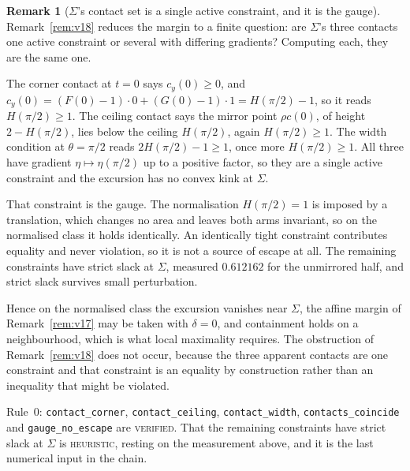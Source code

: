 \documentclass[11pt]{article}
\theoremstyle{definition}
\newtheorem{remark}[theorem]{Remark}
\newcommand{\Sig}{\Sigma}
\begin{document}
\begin{remark}[$\Sig$'s contact set is a single active constraint, and it is the gauge]\label{rem:v19}
Remark~\ref{rem:v18} reduces the margin to a finite question: are $\Sig$'s three contacts one
active constraint or several with differing gradients? Computing each, they are the same one.

The corner contact at $t=0$ says $c_y(0)\ge0$, and
$c_y(0)=(F(0)-1)\cdot0+(G(0)-1)\cdot1=H(\pi/2)-1$, so it reads $H(\pi/2)\ge1$. The ceiling
contact says the mirror point $\rho c(0)$, of height $2-H(\pi/2)$, lies below the ceiling
$H(\pi/2)$, again $H(\pi/2)\ge1$. The width condition at $\theta=\pi/2$ reads
$2H(\pi/2)-1\ge1$, once more $H(\pi/2)\ge1$. All three have gradient $\eta\mapsto\eta(\pi/2)$
up to a positive factor, so they are a single active constraint and the excursion has no
convex kink at $\Sig$.

That constraint is the gauge. The normalisation $H(\pi/2)=1$ is imposed by a translation,
which changes no area and leaves both arms invariant, so on the normalised class it holds
identically. An identically tight constraint contributes equality and never violation, so it
is not a source of escape at all. The remaining constraints have strict slack at $\Sig$,
measured $0.612162$ for the unmirrored half, and strict slack survives small perturbation.

Hence on the normalised class the excursion vanishes near $\Sig$, the affine margin of
Remark~\ref{rem:v17} may be taken with $\delta=0$, and containment holds on a neighbourhood,
which is what local maximality requires. The obstruction of Remark~\ref{rem:v18} does not
occur, because the three apparent contacts are one constraint and that constraint is an
equality by construction rather than an inequality that might be violated.

Rule~0: \verb|contact_corner|, \verb|contact_ceiling|, \verb|contact_width|,
\verb|contacts_coincide| and \verb|gauge_no_escape| are \textsc{verified}. That the remaining
constraints have strict slack at $\Sig$ is \textsc{heuristic}, resting on the measurement
above, and it is the last numerical input in the chain.
\end{remark}
\end{document}
